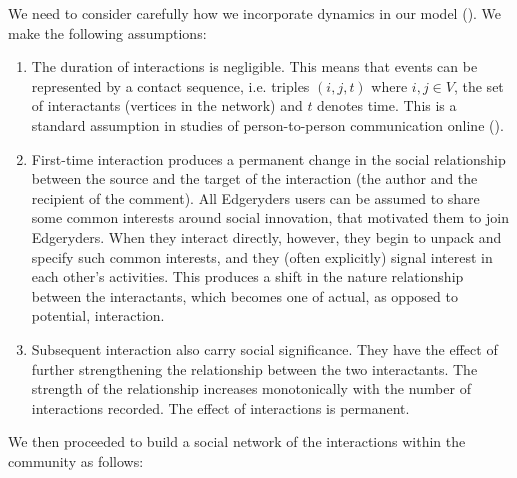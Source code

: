 We need to consider carefully how we incorporate dynamics in our model (\cite{holme2012temporal}). We make the following assumptions:

\begin{enumerate}
\item The duration of interactions is negligible. This means that events can be represented by a contact sequence, i.e. triples $(i, j, t)$ where $i, j \in V$, the set of interactants (vertices in the network) and $t$ denotes time. This is a standard assumption in studies of person-to-person communication online (\cite{holme2012temporal}). 
\item First-time interaction produces a permanent change in the social relationship between the source and the target of the interaction (the author and the recipient of the comment). All Edgeryders users can be assumed to share some common interests around social innovation, that motivated them to join Edgeryders. When they interact directly, however, they begin to unpack and specify such common interests, and they (often explicitly) signal interest in each other's activities. This produces a shift in the nature relationship between the interactants, which becomes one of actual, as opposed to potential, interaction. 
\item Subsequent interaction also carry social significance. They have the effect of further strengthening the relationship between the two interactants. The strength of the relationship increases monotonically with the number of interactions recorded. The effect of interactions is permanent. 
\end{enumerate}


We then proceeded to build a social network of the interactions within the community as follows:


